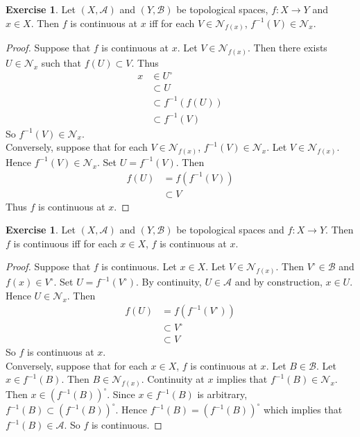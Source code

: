\documentclass[12pt]{amsart}
\theoremstyle{definition}
\newtheorem{ex}[definition]{Exercise}
\newcommand{\MA}{\mathcal{A}}
\newcommand{\MB}{\mathcal{B}}
\newcommand{\MN}{\mathcal{N}}
\newcommand{\lex}[1]{\label{ex:#1}}
\begin{document}
	\begin{ex} \lex{}
	Let $(X,\MA)$ and $(Y,\MB)$ be topological spaces, $f:X \rightarrow Y$ and $x \in X$. Then $f$ is continuous at $x$ iff for each $V \in \MN_{f(x)}$, $f^{-1}(V) \in \MN_{x}$.
	\end{ex}
	
	\begin{proof}
	Suppose that $f$ is continuous at $x$. Let $V \in \MN_{f(x)}$. Then there exists $U \in \MN_x$ such that $f(U) \subset V$. Thus
	\begin{align*}
	x 
	&\in U^{\circ} \\
	& \subset U \\
	&\subset f^{-1}(f(U)) \\
	&\subset f^{-1}(V)
	\end{align*}
	So $f^{-1}(V) \in \MN_x$.\\
	Conversely, suppose that for each $V \in \MN_{f(x)}$, $f^{-1}(V) \in \MN_{x}$. Let $V \in \MN_{f(x)}$. Hence $f^{-1}(V) \in \MN_{x}$. Set $U = f^{-1}(V)$. Then 
	\begin{align*}
	f(U) 
	&= f(f^{-1}(V)) \\
	& \subset V
	\end{align*}
	Thus $f$ is continuous at $x$.
	\end{proof}
	
	\begin{ex} \lex{}
	Let $(X,\MA)$ and $(Y,\MB)$ be topological spaces and $f:X \rightarrow Y$. Then $f$ is continuous iff for each $x \in X$, $f$ is continuous at $x$.
	\end{ex}
	
	\begin{proof}
	Suppose that $f$ is continuous. Let $x \in X$. Let $V \in \MN_{f(x)}$. Then $V^{\circ} \in \MB$ and $f(x) \in V^{\circ}$. Set $U = f^{-1}(V^{\circ})$. By continuity, $U \in \MA$ and by construction, $x \in U$. Hence $U \in \MN_x$. Then 
	\begin{align*}
	f(U)
	&= f(f^{-1}(V^{\circ}))\\
	& \subset V^{\circ}\\
	& \subset V
\end{align*}	 	
So $f$ is continuous at $x$. \\
Conversely, suppose that for each $x \in X$, $f$ is continuous at $x$. Let $B \in \MB$. Let $x \in f^{-1}(B)$. Then $B \in \MN_{f(x)}$. Continuity at $x$ implies that $f^{-1}(B) \in \MN_x$. Then $x \in (f^{-1}(B))^{\circ}$. Since $x \in f^{-1}(B)$ is arbitrary, $f^{-1}(B) \subset (f^{-1}(B))^{\circ}$. Hence $f^{-1}(B) = (f^{-1}(B))^{\circ}$ which implies that $f^{-1}(B) \in \MA$. So $f$ is continuous.
	\end{proof}
	
\end{document}
